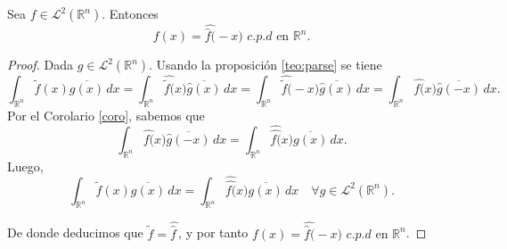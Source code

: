 \begin{teorema}
    Sea $f \in \mathscr{L}^2(\mathbb{R}^n)$. Entonces
    \begin{equation}
        f(x) = \widehat{\widehat{f}(}-x) \, \, c.p.d \,\, \text{en} \,\,  \mathbb{R}^n.
    \end{equation}
\end{teorema}


\begin{proof}

\noindent Dada $g \in \mathscr{L}^2(\mathbb{R}^n)$. Usando la proposición \ref{teo:parse} se tiene 
\begin{equation}
    \int_{\mathbb{R}^n}\widetilde{f}(x)\overline{g(x)} \, dx =\int_{\mathbb{R}^n}\widehat{\widetilde{f}(}x)\overline{\widehat{g}(x)} \, dx = \int_{\mathbb{R}^n}\widehat{\widetilde{f}(}-x)\overline{\widehat{g}(x)} \, dx =\int_{\mathbb{R}^n}\widehat{f(}x)\overline{\widehat{g}(-x)} \, dx.
\end{equation}
Por el Corolario \ref{coro}, sabemos que 
\begin{equation}
\int_{\mathbb{R}^n}\widehat{f(}x)\overline{\widehat{g}(-x)} \, dx  = \int_{\mathbb{R}^n}\widehat{\widehat{f(}}x)\overline{g(x)} \, dx.
\end{equation}
Luego, 
\begin{equation}
    \int_{\mathbb{R}^n}\widetilde{f}(x)\overline{g(x)} \, dx  =\int_{\mathbb{R}^n}\widehat{\widehat{f(}}x)\overline{g(x)} \, dx \quad \forall g \in \mathscr{L}^2(\mathbb{R}^n).
\end{equation}

\noindent De donde deducimos que $\widetilde{f} = \widehat{\widehat{f}\,}$, y por tanto $f(x) = \widehat{\widehat{f}(}-x) \, \, c.p.d \,\, \text{en} \,\,  \mathbb{R}^n$.
\end{proof}


